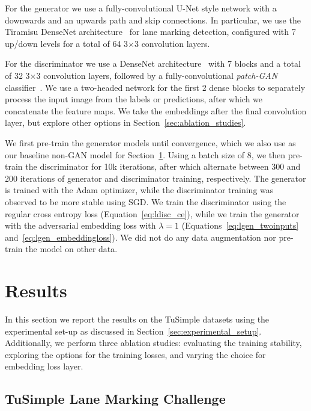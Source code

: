 \documentclass{article} \usepackage{nips13submit_e,times}
\begin{document}
For the generator we use a fully-convolutional U-Net style network with a downwards and an upwards path and skip connections.
In particular, we use the Tiramisu DenseNet architecture~\cite{jegou2017the} for lane marking detection, configured with 7 up/down levels for a total of 64 3$\times$3 convolution layers.


For the discriminator we use a DenseNet architecture~\cite{huang2016densely} with 7 blocks and a total of 32 3$\times$3 convolution layers, followed by a fully-convolutional \textit{patch-GAN} classifier~\cite{li2016precomputed}.
We use a two-headed network for the first 2 dense blocks to separately process the input image from the labels or predictions, after which we concatenate the feature maps.
We take the embeddings after the final convolution layer, but explore other options in Section~\ref{sec:ablation_studies}.

We first pre-train the generator models until convergence, which we also use as our baseline non-GAN model for Section~\ref{sec:results}.
Using a batch size of 8, we then pre-train the discriminator for 10k iterations, after which alternate between 300 and 200 iterations of generator and discriminator training, respectively.
The generator is trained with the Adam optimizer, while the discriminator training was observed to be more stable using SGD.
We train the discriminator using the regular cross entropy loss (Equation~\ref{eq:ldisc_ce}), while we train the generator with the adversarial embedding loss with $\lambda=1$ (Equations~\ref{eq:lgen_twoinputs} and~\ref{eq:lgen_embeddingloss}).
We did not do any data augmentation nor pre-train the model on other data.



\section{Results}
\label{sec:results}

In this section we report the results on the TuSimple datasets using the experimental set-up as discussed in Section~\ref{sec:experimental_setup}.
Additionally, we perform three ablation studies: evaluating the training stability, exploring the options for the training losses, and varying the choice for embedding loss layer.



\subsection{TuSimple Lane Marking Challenge}
\end{document}
